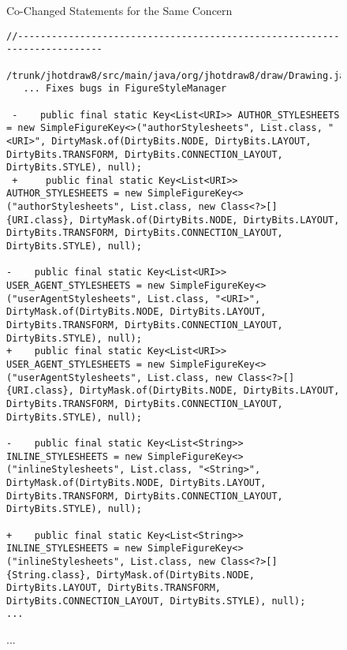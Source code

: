 \begin{figure}[t]
\begin{lstlisting}[]
	\end{lstlisting}
        \vspace{-15pt}
        \caption{Co-Changed Statements for the Same Concern}
        \vspace{-6pt}
        \label{fig:motiv-cc}
\end{figure}

\begin{figure}[t]
	\centering
	\begin{lstlisting}[]
//--------------------------------------------------------------------------
   /trunk/jhotdraw8/src/main/java/org/jhotdraw8/draw/Drawing.java
   ... Fixes bugs in FigureStyleManager
   
 -    public final static Key<List<URI>> AUTHOR_STYLESHEETS = new SimpleFigureKey<>("authorStylesheets", List.class, "<URI>", DirtyMask.of(DirtyBits.NODE, DirtyBits.LAYOUT, DirtyBits.TRANSFORM, DirtyBits.CONNECTION_LAYOUT, DirtyBits.STYLE), null);
 +     public final static Key<List<URI>> AUTHOR_STYLESHEETS = new SimpleFigureKey<>("authorStylesheets", List.class, new Class<?>[]{URI.class}, DirtyMask.of(DirtyBits.NODE, DirtyBits.LAYOUT, DirtyBits.TRANSFORM, DirtyBits.CONNECTION_LAYOUT, DirtyBits.STYLE), null);

-    public final static Key<List<URI>> USER_AGENT_STYLESHEETS = new SimpleFigureKey<>("userAgentStylesheets", List.class, "<URI>", DirtyMask.of(DirtyBits.NODE, DirtyBits.LAYOUT, DirtyBits.TRANSFORM, DirtyBits.CONNECTION_LAYOUT, DirtyBits.STYLE), null);
+    public final static Key<List<URI>> USER_AGENT_STYLESHEETS = new SimpleFigureKey<>("userAgentStylesheets", List.class, new Class<?>[]{URI.class}, DirtyMask.of(DirtyBits.NODE, DirtyBits.LAYOUT, DirtyBits.TRANSFORM, DirtyBits.CONNECTION_LAYOUT, DirtyBits.STYLE), null);

-    public final static Key<List<String>> INLINE_STYLESHEETS = new SimpleFigureKey<>("inlineStylesheets", List.class, "<String>", DirtyMask.of(DirtyBits.NODE, DirtyBits.LAYOUT, DirtyBits.TRANSFORM, DirtyBits.CONNECTION_LAYOUT, DirtyBits.STYLE), null);

+    public final static Key<List<String>> INLINE_STYLESHEETS = new SimpleFigureKey<>("inlineStylesheets", List.class, new Class<?>[]{String.class}, DirtyMask.of(DirtyBits.NODE, DirtyBits.LAYOUT, DirtyBits.TRANSFORM, DirtyBits.CONNECTION_LAYOUT, DirtyBits.STYLE), null);
...
	\end{lstlisting}
        \vspace{-15pt}
        \caption{...}
        \vspace{-6pt}
        \label{fig:history}
\end{figure}

